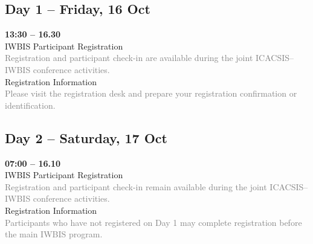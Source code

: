 \documentclass[10pt,a4paper]{article}
\begin{document}
\noindent
\begin{minipage}[t]{0.48\textwidth}
\vspace{0pt}

\subsection*{%
    \colorbox{gray!20}{Day 1 -- Friday, 16 Oct}%
}

\textbf{13:30 -- 16.30}\\
IWBIS Participant Registration\\
\textcolor{gray}{Registration and participant check-in are available during the joint ICACSIS--IWBIS conference activities.}\\

Registration Information\\
\textcolor{gray}{Please visit the registration desk and prepare your registration confirmation or identification.}\\

\vspace{1.5em}

\subsection*{%
    \colorbox{gray!20}{Day 2 -- Saturday, 17 Oct}%
}

\textbf{07:00 -- 16.10}\\
IWBIS Participant Registration\\
\textcolor{gray}{Registration and participant check-in remain available during the joint ICACSIS--IWBIS conference activities.}\\[0.5em]

Registration Information\\
\textcolor{gray}{Participants who have not registered on Day 1 may complete registration before the main IWBIS program.}\\[0.5em]


\end{minipage}
\end{document}

